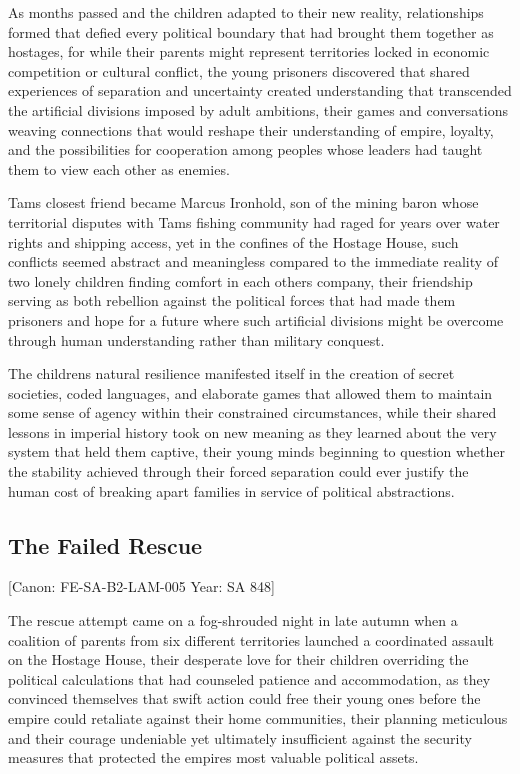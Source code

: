 As months passed and the children adapted to their new reality,
relationships formed that defied every political boundary that had
brought them together as hostages, for while their parents might
represent territories locked in economic competition or cultural
conflict, the young prisoners discovered that shared experiences of
separation and uncertainty created understanding that transcended the
artificial divisions imposed by adult ambitions, their games and
conversations weaving connections that would reshape their understanding
of empire, loyalty, and the possibilities for cooperation among peoples
whose leaders had taught them to view each other as enemies.

Tam\textquotesingle s closest friend became Marcus Ironhold, son of the
mining baron whose territorial disputes with Tam\textquotesingle s
fishing community had raged for years over water rights and shipping
access, yet in the confines of the Hostage House, such conflicts seemed
abstract and meaningless compared to the immediate reality of two lonely
children finding comfort in each other\textquotesingle s company, their
friendship serving as both rebellion against the political forces that
had made them prisoners and hope for a future where such artificial
divisions might be overcome through human understanding rather than
military conquest.

The children\textquotesingle s natural resilience manifested itself in
the creation of secret societies, coded languages, and elaborate games
that allowed them to maintain some sense of agency within their
constrained circumstances, while their shared lessons in imperial
history took on new meaning as they learned about the very system that
held them captive, their young minds beginning to question whether the
stability achieved through their forced separation could ever justify
the human cost of breaking apart families in service of political
abstractions.

\subsection{The Failed Rescue}\label{the-failed-rescue}

{[}Canon: FE-SA-B2-LAM-005 \textbar{} Year: SA 848{]}

The rescue attempt came on a fog-shrouded night in late autumn when a
coalition of parents from six different territories launched a
coordinated assault on the Hostage House, their desperate love for their
children overriding the political calculations that had counseled
patience and accommodation, as they convinced themselves that swift
action could free their young ones before the empire could retaliate
against their home communities, their planning meticulous and their
courage undeniable yet ultimately insufficient against the security
measures that protected the empire\textquotesingle s most valuable
political assets.

